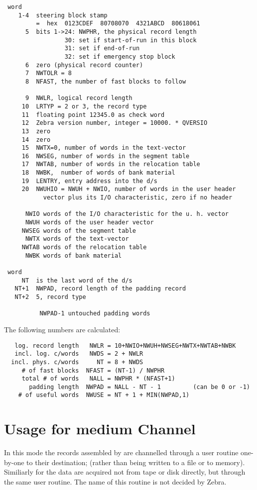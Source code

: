 \begin{verbatim}
 word
    1-4  steering block stamp
         =  hex  0123CDEF  80708070  4321ABCD  80618061
      5  bits 1->24: NWPHR, the physical record length
                 30: set if start-of-run in this block
                 31: set if end-of-run
                 32: set if emergency stop block
      6  zero (physical record counter)
      7  NWTOLR = 8
      8  NFAST, the number of fast blocks to follow

      9  NWLR, logical record length
     10  LRTYP = 2 or 3, the record type
     11  floating point 12345.0 as check word
     12  Zebra version number, integer = 10000. * QVERSIO
     13  zero
     14  zero
     15  NWTX=0, number of words in the text-vector
     16  NWSEG, number of words in the segment table
     17  NWTAB, number of words in the relocation table
     18  NWBK,  number of words of bank material
     19  LENTRY, entry address into the d/s
     20  NWUHIO = NWUH + NWIO, number of words in the user header
           vector plus its I/O characteristic, zero if no header

      NWIO words of the I/O characteristic for the u. h. vector
      NWUH words of the user header vector
     NWSEG words of the segment table
      NWTX words of the text-vector
     NWTAB words of the relocation table
      NWBK words of bank material

 word
     NT  is the last word of the d/s
   NT+1  NWPAD, record length of the padding record
   NT+2  5, record type

          NWPAD-1 untouched padding words
\end{verbatim}
The following numbers are calculated:
\begin{verbatim}
   log. record length   NWLR = 10+NWIO+NWUH+NWSEG+NWTX+NWTAB+NWBK
   incl. log. c/words   NWDS = 2 + NWLR
  incl. phys. c/words     NT = 8 + NWDS
     # of fast blocks  NFAST = (NT-1) / NWPHR
     total # of words   NALL = NWPHR * (NFAST+1)
       padding length  NWPAD = NALL - NT - 1         (can be 0 or -1)
    # of useful words  NWUSE = NT + 1 + MIN(NWPAD,1)
\end{verbatim}

\section{Usage for medium Channel}
\label{sec:FZHOOK}

In this mode the records assembled by  are channelled
through a user routine one-by-one to their destination;
(rather than being written to a file or to memory).
Similiarly for  the data are acquired not
from tape or disk directly, but through the same user routine.
The name of this routine is not decided by Zebra.

